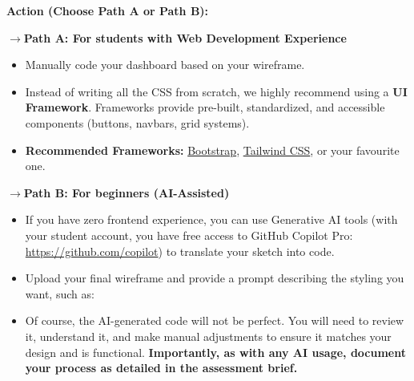 \documentclass[a4paper,12pt]{article}
\begin{document}
\vspace{0.3cm}
\textbf{Action (Choose Path A or Path B):}

\textbf{$\rightarrow$Path A: For students with Web Development Experience}
\begin{itemize}
    \item Manually code your dashboard based on your wireframe.
    \item Instead of writing all the CSS from scratch, we highly recommend using a \textbf{UI Framework}. Frameworks provide pre-built, standardized, and accessible components (buttons, navbars, grid systems).
    \item \textbf{Recommended Frameworks:} \href{https://getbootstrap.com/}{Bootstrap}, \href{https://tailwindcss.com/}{Tailwind CSS}, or your favourite one.
\end{itemize}

\textbf{$\rightarrow$Path B: For beginners (AI-Assisted)}
\begin{itemize}
    \item If you have zero frontend experience, you can use Generative AI tools (with your student account, you have free access to GitHub Copilot Pro: \href{https://github.com/copilot}{https://github.com/copilot}) to translate your sketch into code.
    \item Upload your final wireframe and provide a prompt describing the styling you want, such as:
    \begin{center}
    \end{center}
    \item Of course, the AI-generated code will not be perfect. You will need to review it, understand it, and make manual adjustments to ensure it matches your design and is functional. \textbf{Importantly, as with any AI usage, document your process as detailed in the assessment brief.}
\end{itemize}
\end{document}
